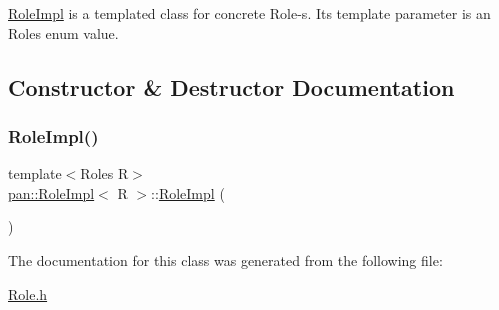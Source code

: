 \hyperlink{classpan_1_1_role_impl}{Role\+Impl} is a templated class for concrete Role-\/s. Its template parameter is an Roles enum value. 

\subsection{Constructor \& Destructor Documentation}
\mbox{\label{classpan_1_1_role_impl_aa747c97282c72f41398e99a6fbdb62ae}} 
\subsubsection{\texorpdfstring{Role\+Impl()}{RoleImpl()}}
{\footnotesize\ttfamily template$<$Roles R$>$ \\
\hyperlink{classpan_1_1_role_impl}{pan\+::\+Role\+Impl}$<$ R $>$\+::\hyperlink{classpan_1_1_role_impl}{Role\+Impl} (\begin{DoxyParamCaption}{ }\end{DoxyParamCaption})}



The documentation for this class was generated from the following file\+:\begin{DoxyCompactItemize}
\item 
\hyperlink{_role_8h}{Role.\+h}\end{DoxyCompactItemize}
